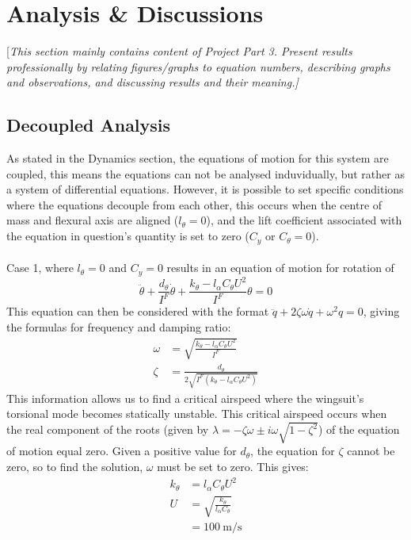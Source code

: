 \documentclass[11pt]{article}
\begin{document}
\section*{Analysis \& Discussions}\label{sec:anal_disc}
[\textcolor[rgb]{0.80,0.29,0.09}{\textsl{This section mainly contains content of Project Part 3. Present results professionally by relating figures/graphs to equation numbers, describing graphs and observations, and discussing results and their meaning.]}}
\subsection*{Decoupled Analysis}\label{sec:coupled_analysis}
As stated in the Dynamics section, the equations of motion for this system are coupled, this means the equations can not be analysed induvidually, but rather as a system of differential equations.
However, it is possible to set specific conditions where the equations decouple from each other, this occurs when the centre of mass and flexural axis are aligned ($l_{\theta} = 0$), and the lift coefficient associated with the equation in question's quantity is set to zero ($C_y$ or $C_{\theta} = 0 $). \\\\
Case 1, where $l_{\theta} = 0$ and $C_y = 0$ results in an equation of motion for rotation of
\begin{equation}
  \ddot{\theta}+\frac{d_{\theta}}{I^F}\dot{\theta}+\frac{k_{\theta}-l_{\alpha}C_{\theta}U^2}{I^F}\theta = 0 \label{eq:decoupled1}
\end{equation}
This equation can then be considered with the format $\ddot{q} + 2\zeta\omega\dot{q}+\omega^2q = 0$, giving the formulas for frequency and damping ratio:
\begin{align*}
  \omega &= \sqrt{\frac{k_{\theta}-l_{\alpha}C_{\theta}U^2}{I^F}} \\
  \zeta &= \frac{d_{\theta}}{2\sqrt{I^F(k_{\theta}-l_{\alpha}C_{\theta}U^2)}}
\end{align*}
This information allows us to find a critical airspeed where the wingsuit's torsional mode becomes statically unstable.
This critical airspeed occurs when the real component of the roots (given by $\lambda = -\zeta\omega\pm i\omega\sqrt{1-\zeta^2}$) of the equation of motion equal zero.
Given a positive value for $d_{\theta}$, the equation for $\zeta$ cannot be zero, so to find the solution, $\omega$ must be set to zero. This gives:
\begin{align*}
  k_{\theta} &= l_{\alpha}C_{\theta}U^2 \\
  U &= \sqrt{\frac{k_{\theta}}{l_{\alpha}C_{\theta}}}\\
    &= 100~\mathrm{m/s}
\end{align*}
\end{document}
